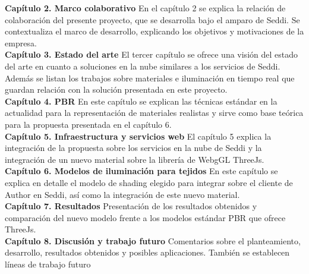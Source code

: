\textbf{Cap\'itulo 2. Marco colaborativo}
En el cap\'itulo 2 se explica la relaci\'on de colaboraci\'on del presente proyecto, que se desarrolla bajo el amparo de Seddi.
Se contextualiza el marco de desarrollo, explicando los objetivos y motivaciones de la empresa.\\

\textbf{Cap\'itulo 3. Estado del arte}
El tercer cap\'itulo se ofrece una visi\'on del estado del arte en cuanto a soluciones en la nube similares a los servicios
de Seddi. Adem\'as se listan los trabajos sobre materiales e iluminaci\'on en tiempo real que guardan relaci\'on con la
soluci\'on presentada en este proyecto.\\

\textbf{Cap\'itulo 4. PBR}
En este cap\'itulo se explican las t\'ecnicas est\'andar en la actualidad para la representaci\'on de materiales realistas y
sirve como base te\'orica para la propuesta presentada en el cap\'itulo 6.\\

\textbf{Cap\'itulo 5. Infraestructura y servicios web}
El cap\'itulo 5 explica la integraci\'on de la propuesta sobre los servicios en la nube de Seddi y la integraci\'on de un nuevo material
sobre la librer\'ia de WebgGL ThreeJs.\\

\textbf{Cap\'itulo 6. Modelos de iluminaci\'on para tejidos}
En este cap\'itulo se explica en detalle el modelo de shading elegido para integrar sobre el cliente de Author en Seddi, as\'i como
la integraci\'on de este nuevo material.\\

\textbf{Cap\'itulo 7. Resultados}
Presentaci\'on de los resultados obtenidos y comparaci\'on del nuevo modelo frente a los modelos est\'andar PBR que ofrece ThreeJs.\\

\textbf{Cap\'itulo 8. Discusi\'on y trabajo futuro}
Comentarios sobre el planteamiento, desarrollo, resultados obtenidos y posibles aplicaciones. Tambi\'en se establecen
l\'ineas de trabajo futuro 

